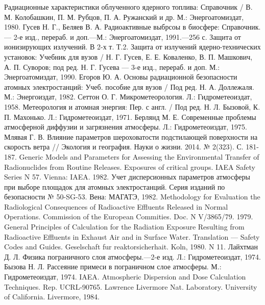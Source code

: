 \begin{thebibliography}{99}
	 Радиационные характеристики облученного ядерного топлива: Справочник / В. М. Колобашкин, П. М. 
		Рубцов, П. А. Ружанский и др. М.: Энергоатомиздат, 1980.
	 Гусев Н. Г., Беляев В. А. Радиоактивные выбрсоы в биосфере: Справочник. --- 2-е изд., перераб. 
		и доп.---М.: Энергоатомиздат, 1991.---256 с.
	 Защита от ионизирующих излучений. В 2-х т. Т.2. Защита от излучений ядерно-технических 
		установок: Учебник для вузов / Н. Г. Гусев, Е. Е. Коваленко, В. П. Машкович, А. П. Суворов; под ред. Н. Г. 
		Гусева --- 3-е изд., перераб. и доп. М.: Энергоатомиздат, 1990.
	 Егоров Ю. А. Основы радиационной безопасности атомных электростанций: Учеб. пособие для вузов / 
		Под ред. Н. А. Доллежаля. М.: Энергоиздат, 1982.
	 Сеттон О. Г. Микрометеорология. Л.: Гидрометеоиздат, 1958.
	 Метеорология и атомная энергия: Пер. с англ. / Под ред. Н. Л. Бызовой, К. П. Махонько. 
		Л.: Гидрометеоиздат, 1971.
	 Берлянд М. Е. Современные проблемы атмосферной диффузии и загрязнения атмосферы. Л.: 
		Гидрометеоиздат, 1975.
	 Млявая Г. В. Влияние параметров шероховатости подстилающей поверхности на скорость ветра // 
		Экология и география. Науки о жизни. 2014. № 2(323). С. 181-187.
	 Generic Models and Parameters for Assessing the Environmental Transfer of Radionuclides 
		from Routine Releases. Exposures of critical groups. IAEA Safety Series N 57. Vienna: IAEA. 1982.
	 Учет дисперсионных параметров атмосферы при выборе площадок для атомных электростанций. 
		Серия изданий по безопасности № 50-SG-53. Вена: МАГАТЭ, 1982.
	 Methodology for Evaluation the Radiological Consequences of Radioactive Effluents Released in 
		Normal Operations. Commission of the European Commities. Doc. N V/3865/79. 1979.
	 General Principles of Calculation for the Radiation Exposure Resulting from Radioactive 
		Effluents in Exhaust Air and in Surface Water. Translation --- Safety Codes and Guides. Geselschaft fur 
		reaktorsicherhait. Koln, 1980. N 11.
	 Лайхтман Д. Л. Физика пограничного слоя атмосферы.---2-е изд. Л.: Гидрометеоиздат, 1974. 
	 Бызова Н. Л. Рассеяние примеси в пограничном слое атмосферы. М.: Гидрометеоиздат, 1974.
	 IAEA. Atmospheric Dispersion and Dose Calculation Techniques. Rep. UCRL-90765. Lawrence 
		Livermore Nat. Laboratory. University of California. Livermore, 1984.

\end{thebibliography}
